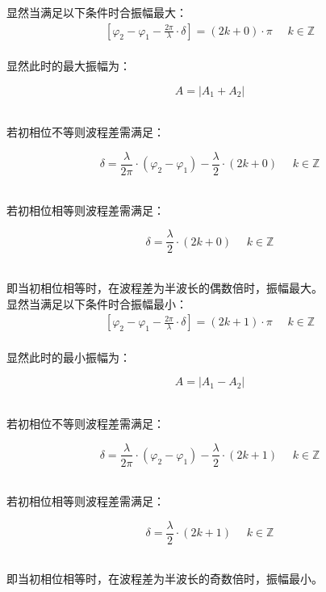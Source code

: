 \documentclass[UTF8]{ctexart}
\begin{document}
\newpage

    显然当满足以下条件时合振幅最大：
    \begin{align}
        \left[\varphi_2-\varphi_1-\frac{2\pi}{\lambda}\cdot\delta\right]=(2k+0)\cdot\pi~~~~~~k\in\mathbb{Z}
    \end{align}\\
    显然此时的最大振幅为：
    \begin{large}
        \begin{equation*}
            A=|A_1+A_2|
        \end{equation*}
    \end{large}\\
    若初相位不等则波程差需满足：
    \begin{large}
        \begin{equation*}
            \delta=\frac{\lambda}{2\pi}\cdot(\varphi_2-\varphi_1)-\frac{\lambda}{2}\cdot(2k+0)~~~~~~k\in\mathbb{Z}
        \end{equation*}
    \end{large}\\
    若初相位相等则波程差需满足：
    \begin{large}
        \begin{equation*}
            \delta=\frac{\lambda}{2}\cdot(2k+0)~~~~~~k\in\mathbb{Z}
        \end{equation*}
    \end{large}\\
    即当初相位相等时，在波程差为半波长的偶数倍时，振幅最大。\\[16mm]
    显然当满足以下条件时合振幅最小：
    \begin{align}
        \left[\varphi_2-\varphi_1-\frac{2\pi}{\lambda}\cdot\delta\right]=(2k+1)\cdot\pi~~~~~~k\in\mathbb{Z}
    \end{align}\\
    显然此时的最小振幅为：
    \begin{large}
        \begin{equation*}
            A=|A_1-A_2|
        \end{equation*}
    \end{large}\\
    若初相位不等则波程差需满足：
    \begin{large}
        \begin{equation*}
            \delta=\frac{\lambda}{2\pi}\cdot(\varphi_2-\varphi_1)-\frac{\lambda}{2}\cdot(2k+1)~~~~~~k\in\mathbb{Z}
        \end{equation*}
    \end{large}\\
    若初相位相等则波程差需满足：
    \begin{large}
        \begin{equation*}
            \delta=\frac{\lambda}{2}\cdot(2k+1)~~~~~~k\in\mathbb{Z}
        \end{equation*}
    \end{large}\\
    即当初相位相等时，在波程差为半波长的奇数倍时，振幅最小。
\end{document}
